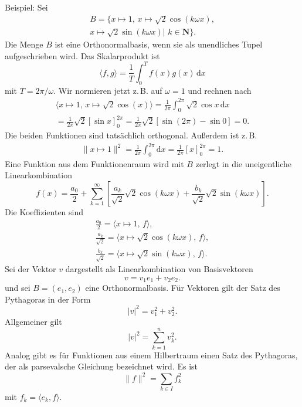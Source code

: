 \documentclass[a4paper,11pt,fleqn,twocolumn,twoside]{scrartcl}
\numberwithin{equation}{section}
\begin{document}
Beispiel: Sei
\begin{gather*}
B=\{x\mapsto 1,\,x\mapsto\sqrt{2}\cos(k\omega x),\\
x\mapsto\sqrt{2}\sin(k\omega x)|\,\,k\in\mathbf N\}.
\end{gather*}
Die Menge $B$ ist eine Orthonormalbasis, wenn sie als unendliches
Tupel aufgeschrieben wird. Das Skalarprodukt ist
\begin{equation}
\langle f,g\rangle = \frac{1}{T}\int_0^T f(x)g(x)\,\mathrm dx
\end{equation}
mit $T=2\pi/\omega$. Wir normieren jetzt z.\,B. auf $\omega=1$ und
rechnen nach
\begin{gather*}
\langle x\mapsto 1,\,x\mapsto\sqrt{2}\cos(x)\rangle
= \frac{1}{2\pi}\int_0^{2\pi} \sqrt{2}\cos x\,\mathrm dx\\
= \frac{1}{2\pi}\sqrt{2}[\sin x]_0^{2\pi}
= \frac{1}{2\pi}\sqrt{2}[\sin(2\pi)-\sin 0] = 0.
\end{gather*}
Die beiden Funktionen sind tatsächlich orthogonal. Außerdem ist z.\,B.
\begin{gather*}
\|x\mapsto 1\|^2= \frac{1}{2\pi}\int_0^{2\pi} \mathrm dx
= \frac{1}{2\pi}[x]_0^{2\pi}=1.
\end{gather*}
Eine Funktion aus dem Funktionenraum wird mit $B$ zerlegt in die
uneigentliche Linearkombination
\[f(x) = \frac{a_0}{2}+\sum_{k=1}^\infty
[\frac{a_k}{\sqrt{2}}\sqrt{2}\cos(k\omega x)
+\frac{b_k}{\sqrt{2}}\sqrt{2}\sin(k\omega x)].\]
Die Koeffizienten sind
\begin{gather}
\frac{a_0}{2}
= \langle x\mapsto 1,\,f\rangle,\\
\frac{a_k}{\sqrt{2}}
= \langle x\mapsto \sqrt{2}\cos(k\omega x),\,f\rangle,\\
\frac{b_k}{\sqrt{2}}
= \langle x\mapsto \sqrt{2}\sin(k\omega x),\,f\rangle.
\end{gather}
%
Sei der Vektor $v$ dargestellt als Linearkombination von
Basisvektoren
\begin{equation}
v = v_1e_1+v_2e_2.
\end{equation}
und sei $B=(e_1,e_2)$ eine Orthonormalbasis.
Für Vektoren gilt der Satz des Pythagoras in der Form
\begin{equation}
|v|^2 = v_1^2+v_2^2.
\end{equation}
Allgemeiner gilt
\begin{equation}
|v|^2 = \sum_{k=1}^n v_k^2.
\end{equation}
Analog gibt es für Funktionen aus einem Hilbertraum einen Satz des
Pythagoras, der als
parsevalsche Gleichung bezeichnet wird. Es ist
\begin{equation}
\|f\|^2 = \sum_{k\in I} f_k^2
\end{equation}
mit $f_k=\langle e_k,f\rangle$.
\end{document}
